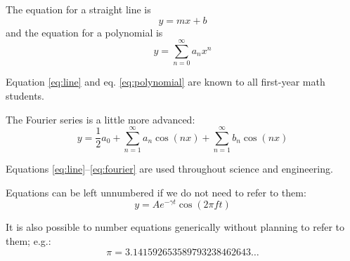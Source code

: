 The equation for a straight line is
\begin{equation} y = mx + b \label{eq:line}\end{equation} and the
equation for a polynomial is
\begin{equation} y = \sum_{n=0}^{\infty} a_n x^n \label{eq:polynomial}\end{equation}

Equation \ref{eq:line} and eq. \ref{eq:polynomial} are known to all
first-year math students.

The Fourier series is a little more advanced:
\begin{equation} y = \frac{1}{2}a_0 + \sum_{n=1}^{\infty}a_n\cos(nx)
                      + \sum_{n=1}^{\infty}b_n\cos(nx)
\label{eq:fourier}\end{equation}

Equations \ref{eq:line}--\ref{eq:fourier} are used throughout science
and engineering.

Equations can be left unnumbered if we do not need to refer to them:
\[ y = A e^{-\gamma t}\cos(2\pi f t) \]

It is also possible to number equations generically without planning to
refer to them; e.g.:
\begin{equation} \pi = 3.141592653589793238462643\dots \end{equation} 
